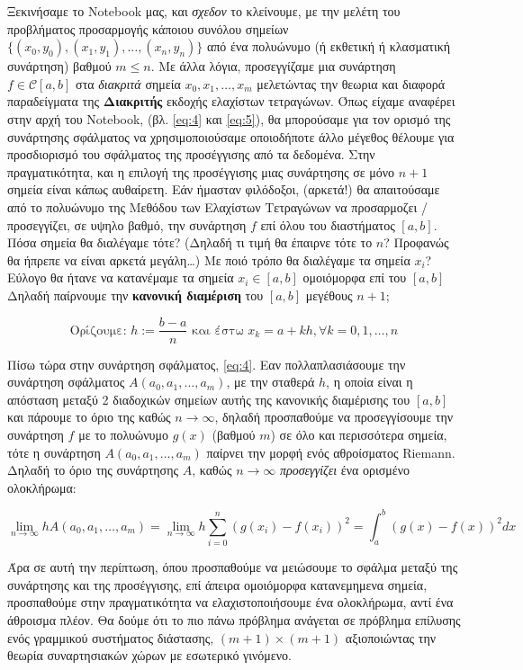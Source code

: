 \documentclass[12pt]{article}
\begin{document}
Ξεκινήσαμε το Notebook μας, και \emph{σχεδον} το κλείνουμε, με την
μελέτη του προβλήματος προσαρμογής κάποιου συνόλου σημείων
\(\{(x_0,y_0),(x_1,y_1),\dots,(x_{n},y_{n})\}\) από ένα πολυώνυμο (ή
εκθετική ή κλασματική συνάρτηση) βαθμού \(m \leq n\). Mε άλλα λόγια,
προσεγγίζαμε μια συνάρτηση \(f \in \mathcal{C}[a,b]\) στα
\emph{διακριτά} σημεία \(x_0,x_1,\dots,x_m\) μελετώντας την θεωρια και
διαφορά παραδείγματα της \textbf{Διακριτής} εκδοχής ελαχίστων
τετραγώνων. Όπως είχαμε αναφέρει στην αρχή του Notebook, (βλ.
\eqref{eq:4} και \eqref{eq:5}), θα μπορούσαμε για τον ορισμό της
συνάρτησης σφάλματος να χρησιμοποιούσαμε οποιοδήποτε άλλο μέγεθος
θέλουμε για προσδιορισμό του σφάλματος της προσέγγισης από τα δεδομένα.
Στην πραγματικότητα, και η επιλογή της προσέγγισης μιας συνάρτησης σε
μόνο \(n+1\) σημεία είναι κάπως αυθαίρετη. Εάν ήμασταν φιλόδοξοι,
(αρκετά!) θα απαιτούσαμε από το πολυώνυμο της Μεθόδου των Ελαχίστων
Τετραγώνων να προσαρμοζει / προσεγγίζει, σε υψηλο βαθμό, την συνάρτηση
\(f\) επί όλου του διαστήματος \([a,b]\). Πόσα σημεία θα διαλέγαμε τότε?
(Δηλαδή τι τιμή θα έπαιρνε τότε το \(n\)? Προφανώς θα ήπρεπε να είναι
αρκετά μεγάλη\ldots) Με ποιό τρόπο θα διαλέγαμε τα σημεία \(x_i\)?
Eύλογο θα ήτανε να κατανέμαμε τα σημεία \(x_i \in [a,b]\) ομοιόμορφα επί
του \([a,b]\) Δηλαδή παίρνουμε την \textbf{κανονική διαμέριση} του
\([a,b]\) μεγέθους \(n+1\);

\[
\text{Oρίζουμε: } h:=\frac{b-a}{n}  \text{ και έστω } x_k=a+kh, \forall k=0,1,\dots,n \nonumber
\]

Πίσω τώρα στην συνάρτηση σφάλματος, \eqref{eq:4}. Eαν πολλαπλασιάσουμε
την συνάρτηση σφάλματος \(Α(a_0,a_1,\dots,a_m)\), με την σταθερά \(h\),
η οποία είναι η απόσταση μεταξύ 2 διαδοχικών σημείων αυτής της κανονικής
διαμέρισης του \([a,b]\) και πάρουμε το όριο της καθώς \(n \to \infty\),
δηλαδή προσπαθούμε να προσεγγίσουμε την συνάρτηση \(f\) με το πολυώνυμο
\(g(x)\) (βαθμού \(m\)) σε όλο και περισσότερα σημεία, τότε η συνάρτηση
\(Α(a_0,a_1,\dots,a_m)\) παίρνει την μορφή ενός αθροίσματος Riemann.
Δηλαδή το όριο της συνάρτησης \(A\), καθώς \(n \to \infty\)
\emph{προσεγγίζει} ένα ορισμένο ολοκλήρωμα:

\[
\lim_{n \to \infty} hΑ(a_0,a_1,\dots,a_m) = \lim_{n \to \infty} h \sum_{i=0}^n(g(x_i)-f(x_i))^2 = \int_a^b (g(x)-f(x))^2dx \nonumber
\]

Άρα σε αυτή την περίπτωση, όπου προσπαθούμε να μειώσουμε το σφάλμα
μεταξύ της συνάρτησης και της προσέγγισης, επί άπειρα ομοιόμορφα
κατανεμημενα σημεία, προσπαθούμε στην πραγματικότητα να
ελαχιστοποιήσουμε ένα ολοκλήρωμα, αντί ένα άθροισμα πλέον. Θα δούμε ότι
το πιο πάνω πρόβλημα ανάγεται σε πρόβλημα επίλυσης ενός γραμμικού
συστήματος διάστασης, \((m+1) \times (m+1)\) αξιοποιώντας την θεωρία
συναρτησιακών χώρων με εσωτερικό γινόμενο.
\end{document}
